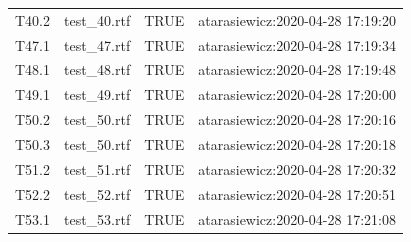 \documentclass[]{article}
\begin{document}
\begin{longtable}{llll}
\rowcolor{gray!6}  T40.2 & test\_40.rtf & TRUE & atarasiewicz:2020-04-28 17:19:20\\
T47.1 & test\_47.rtf & TRUE & atarasiewicz:2020-04-28 17:19:34\\
\rowcolor{gray!6}  T48.1 & test\_48.rtf & TRUE & atarasiewicz:2020-04-28 17:19:48\\
\addlinespace
T49.1 & test\_49.rtf & TRUE & atarasiewicz:2020-04-28 17:20:00\\
\rowcolor{gray!6}  T50.2 & test\_50.rtf & TRUE & atarasiewicz:2020-04-28 17:20:16\\
T50.3 & test\_50.rtf & TRUE & atarasiewicz:2020-04-28 17:20:18\\
\rowcolor{gray!6}  T51.2 & test\_51.rtf & TRUE & atarasiewicz:2020-04-28 17:20:32\\
T52.2 & test\_52.rtf & TRUE & atarasiewicz:2020-04-28 17:20:51\\
\addlinespace
\rowcolor{gray!6}  T53.1 & test\_53.rtf & TRUE & atarasiewicz:2020-04-28 17:21:08\\*
\end{longtable}
\end{document}
